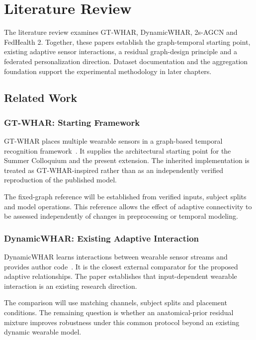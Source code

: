 \documentclass[10pt,a4paper,oneside,openany]{report}
\begin{document}
\cleardoublepage
\chapter{Literature Review}
\label{chap:literature}

The literature review examines GT-WHAR, DynamicWHAR, 2s-AGCN and FedHealth 2. Together, these papers establish the graph-temporal starting point, existing adaptive sensor interactions, a residual graph-design principle and a federated personalization direction. Dataset documentation and the aggregation foundation support the experimental methodology in later chapters.

\section{Related Work}

\subsection{GT-WHAR: Starting Framework}

GT-WHAR places multiple wearable sensors in a graph-based temporal recognition framework~\cite{gtwhar}. It supplies the architectural starting point for the Summer Colloquium and the present extension. The inherited implementation is treated as GT-WHAR-inspired rather than as an independently verified reproduction of the published model.

The fixed-graph reference will be established from verified inputs, subject splits and model operations. This reference allows the effect of adaptive connectivity to be assessed independently of changes in preprocessing or temporal modeling.

\subsection{DynamicWHAR: Existing Adaptive Interaction}

DynamicWHAR learns interactions between wearable sensor streams and provides author code~\cite{dynamicwhar}. It is the closest external comparator for the proposed adaptive relationships. The paper establishes that input-dependent wearable interaction is an existing research direction.

The comparison will use matching channels, subject splits and placement conditions. The remaining question is whether an anatomical-prior residual mixture improves robustness under this common protocol beyond an existing dynamic wearable model.
\end{document}
